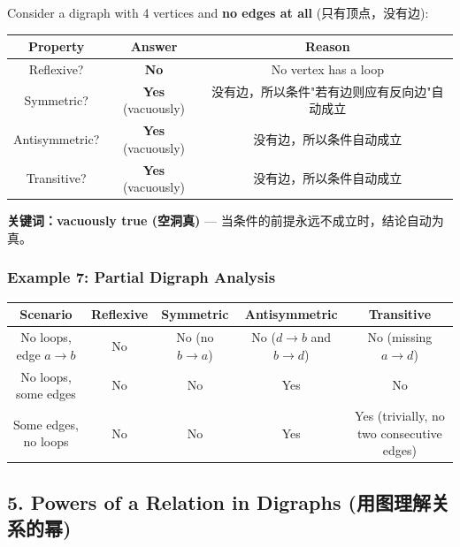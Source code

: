 \documentclass[10pt,a4paper,openany]{ctexbook}
\theoremstyle{definition}
\theoremstyle{remark}
\renewenvironment{quote}
  {\list{}{\leftmargin=1em\rightmargin=0pt\topsep=0.5pt\partopsep=0pt}\item[]}
  {\endlist}
\begin{document}
Consider a digraph with 4 vertices and \textbf{no edges at all} (只有顶点，没有边):
\begin{center}
\begin{tabular}{ccc}
\hline
Property & Answer & Reason \\ \hline
Reflexive? & \textbf{No} & No vertex has a loop \\
Symmetric? & \textbf{Yes} (vacuously) & 没有边，所以条件"若有边则应有反向边"自动成立 \\
Antisymmetric? & \textbf{Yes} (vacuously) & 没有边，所以条件自动成立 \\
Transitive? & \textbf{Yes} (vacuously) & 没有边，所以条件自动成立 \\
\hline
\end{tabular}

\end{center}

\begin{quote}
\textbf{关键词：vacuously true (空洞真)} — 当条件的前提永远不成立时，结论自动为真。

\end{quote}

\subsubsection{Example 7: Partial Digraph Analysis}

\begin{center}
\begin{tabular}{ccccc}
\hline
Scenario & Reflexive & Symmetric & Antisymmetric & Transitive \\ \hline
No loops, edge $a \to b$ & No & No (no $b \to a$) & No ($d \to b$ and $b \to d$) & No (missing $a \to d$) \\
No loops, some edges & No & No & Yes & No \\
Some edges, no loops & No & No & Yes & Yes (trivially, no two consecutive edges) \\
\hline
\end{tabular}

\end{center}

\vspace{-2pt}

\subsection{5. Powers of a Relation in Digraphs (用图理解关系的幂)}
\end{document}
